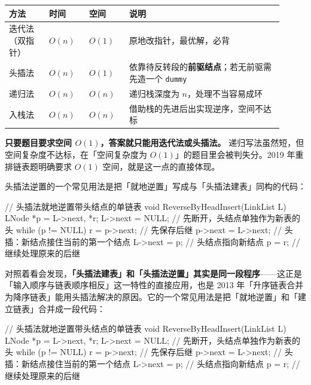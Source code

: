 \documentclass[11pt,openany,UTF8]{ctexbook}
\begin{document}
\begingroup\small\setlength{\tabcolsep}{4.0pt}
\begin{longtable}{@{}L{0.1360\linewidth}L{0.1360\linewidth}L{0.1360\linewidth}L{0.5035\linewidth}@{}}
\toprule
\textbf{方法} & \textbf{时间} & \textbf{空间} & \textbf{说明} \\
\midrule
\endhead
迭代法（双指针） & $O(n)$ & $O(1)$ & 原地改指针，最优解，必背 \\
头插法 & $O(n)$ & $O(1)$ & 依靠待反转段的\textbf{前驱结点}；若无前驱需先造一个 \texttt{dummy} \\
递归法 & $O(n)$ & $O(n)$ & 递归栈深度为 $n$，处理不当容易成环 \\
入栈法 & $O(n)$ & $O(n)$ & 借助栈的先进后出实现逆序，空间不达标 \\
\bottomrule
\end{longtable}
\endgroup

\textbf{只要题目要求空间 $O(1)$，答案就只能用迭代法或头插法。} 递归写法虽然短，但空间复杂度不达标，在「空间复杂度为 $O(1)$」的题目里会被判失分。2019 年重排链表题明确要求 $O(1)$ 空间，就是这一点的直接体现。

头插法逆置的一个常见用法是把「就地逆置」写成与「头插法建表」同构的代码：

\begin{codebox}
// 头插法就地逆置带头结点的单链表
void ReverseByHeadInsert(LinkList L) {
    LNode *p = L->next, *r;
    L->next = NULL;              // 先断开，头结点单独作为新表的头
    while (p != NULL) {
        r = p->next;             // 先保存后继
        p->next = L->next;       // 头插：新结点接住当前的第一个结点
        L->next = p;             // 头结点指向新结点
        p = r;                   // 继续处理原来的后继
    }
}
\end{codebox}

对照着看会发现，\textbf{「头插法建表」和「头插法逆置」其实是同一段程序}——这正是「输入顺序与链表顺序相反」这一特性的直接应用，也是 2013 年「升序链表合并为降序链表」能用头插法解决的原因。它的一个常见用法是把「就地逆置」和「建立链表」合并成一段代码：

\begin{codebox}
// 头插法就地逆置带头结点的单链表
void ReverseByHeadInsert(LinkList L) {
    LNode *p = L->next, *r;
    L->next = NULL;              // 先断开，头结点单独作为新表的头
    while (p != NULL) {
        r = p->next;             // 先保存后继
        p->next = L->next;       // 头插：新结点接住当前的第一个结点
        L->next = p;             // 头结点指向新结点
        p = r;                   // 继续处理原来的后继
    }
}
\end{codebox}
\end{document}
